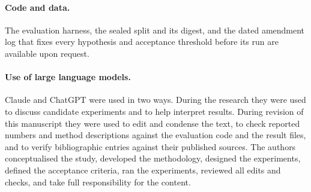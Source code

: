 \documentclass[10pt,twocolumn,letterpaper]{article}
\begin{document}
\paragraph{Code and data.}
The evaluation harness, the sealed split and its digest, and the dated
amendment log that fixes every hypothesis and acceptance threshold before
its run are available upon request.

\paragraph{Use of large language models.}
Claude and ChatGPT were used in two ways. During the research they were
used to discuss candidate experiments and to help interpret results. During
revision of this manuscript they were used to edit and condense the text, to
check reported numbers and method descriptions against the evaluation code
and the result files, and to verify bibliographic entries against their
published sources. The authors conceptualised the study, developed the
methodology, designed the experiments, defined the acceptance criteria, ran
the experiments, reviewed all edits and checks, and take full
responsibility for the content.

{\small
{}

}
\end{document}
